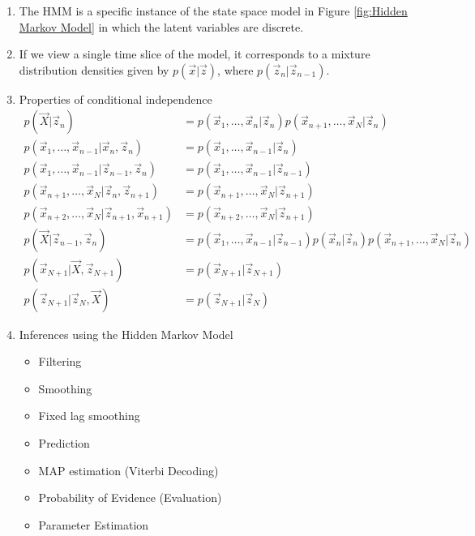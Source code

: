 \documentclass[12pt,twoside]{article}
\begin{document}
\begin{enumerate}
	\item The HMM is a specific instance of the state space model in Figure \ref{fig:Hidden Markov Model} in which the latent variables are discrete.
	\item If we view a single time slice of the model, it corresponds to a mixture distribution densities given by $p(\vec{x}\vert \vec{z})$, where $p(\vec{z}_n \vert \vec{z}_{n-1})$.
	\item Properties of conditional independence
	\begin{align*}
		p(\vec{X}\vert \vec{z}_n)	 &= p(\vec{x}_1,\ldots, \vec{x}_n\vert \vec{z}_n)p(\vec{x}_{n+1},\ldots, \vec{x}_N\vert \vec{z}_n)\\
		p(\vec{x}_1,\ldots, \vec{x}_{n-1} \vert \vec{x}_n, \vec{z}_n)	&= p(\vec{x}_1,\ldots, \vec{x}_{n-1}\vert \vec{z}_n)\\
		p(\vec{x}_1,\ldots, \vec{x}_{n-1} \vert \vec{z}_{n-1}, \vec{z}_n)	&= p(\vec{x}_1,\ldots, \vec{x}_{n-1}\vert \vec{z}_{n-1})\\
		p(\vec{x}_{n+1},\ldots, \vec{x}_N \vert \vec{z}_n, \vec{z}_{n+1})&= p(\vec{x}_{n+1},\ldots, \vec{x}_N \vert \vec{z}_{n+1})\\
		p(\vec{x}_{n+2},\ldots, \vec{x}_N \vert \vec{z}_{n+1}, \vec{x}_{n+1})	& =p(\vec{x}_{n+2},\ldots, \vec{x}_N \vert \vec{z}_{n+1})\\
		p(\vec{X}\vert \vec{z}_{n-1}, \vec{z}_n) & = p(\vec{x}_1,\ldots, \vec{x}_{n-1}\vert \vec{z}_{n-1})p(\vec{x}_n\vert\vec{z}_n)p(\vec{x}_{n+1},\ldots, \vec{x}_N\vert \vec{z}_n)\\
		p(\vec{x}_{N+1}\vert \vec{X}, \vec{z}_{N+1})& = p(\vec{x}_{N+1}\vert \vec{z}_{N+1})\\
		p(\vec{z}_{N+1}\vert \vec{z}_N, \vec{X})	& = p(\vec{z}_{N+1}\vert \vec{z}_N)
	\end{align*}		
	
	\item Inferences using the Hidden Markov Model
		\begin{itemize}
			\item Filtering
			\item Smoothing
			\item Fixed lag smoothing
			\item Prediction 
			\item MAP estimation (Viterbi Decoding)
			\item Probability of Evidence (Evaluation)
			\item Parameter Estimation
		\end{itemize}

\end{enumerate}
\end{document}
